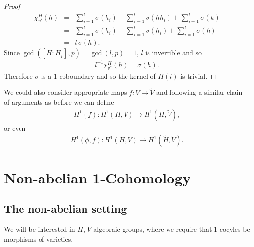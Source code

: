 \begin{proof}
\begin{eqnarray*}
	\chi_{v^*}^H(h) &=& \sum_{i = 1}^l\sigma(h_i) - \sum_{i = 1}^l \sigma(hh_i) +\sum_{i = 1}^l \sigma(h)\\
	&=& \sum_{i = 1}^l\sigma(h_i) - \sum_{i = 1}^l \sigma(h_i) +\sum_{i = 1}^l \sigma(h) \\
	&=& l\, \sigma(h).
\end{eqnarray*}
Since $\gcd([H:H_p], p) = \gcd(l,p) = 1$, $l$ is invertible and so
\begin{eqnarray*}
	l^{-1}\chi_{v^*}^H(h) = \sigma(h).
\end{eqnarray*}
Therefore $\sigma$ is a 1-coboundary and so the kernel of $H(i)$ is trivial.
\end{proof}

We could also consider appropriate maps $f:V\rightarrow\tilde{V}$ and following a similar chain of arguments as before we can define
\begin{eqnarray*}
	H^1(f):H^1(H, V)\rightarrow H^1(H, \tilde{V}),
\end{eqnarray*}
or even	
\begin{eqnarray*}
	H^1(\phi, f):H^1(H, V)\rightarrow H^1(\tilde{H}, \tilde{V}).
\end{eqnarray*}

\section{Non-abelian 1-Cohomology}
	
\subsection{The non-abelian setting}

We will be interested in $H$, $V$ algebraic groups, where we require that 1-cocyles be morphisms of varieties. 

